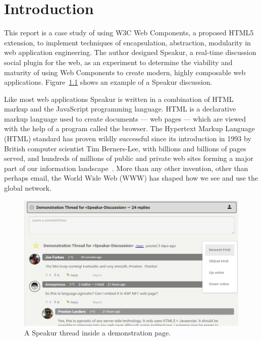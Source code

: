 \chapter{Introduction}
%
\label{ch:intro}

%
%

This report is a case study of using W3C Web Components, 
a proposed HTML5 extension,
to implement techniques of encapsulation, abstraction, modularity in web application engineering.
The author designed Speakur, a real-time discussion social plugin for the web, 
as an experiment to determine the viability and maturity of using Web Components to create modern, highly composable web applications. Figure~\ref{f:demo1} shows an example of a Speakur discussion.

Like most web applications Speakur is written in a combination of HTML markup and the Java\-Script programming language. 
HTML is a declarative markup language used to create documents --- web pages --- which are viewed with the help of a program called the browser. 
The Hyper\-text Markup Language (HTML) 
standard has proven wildly successful since its introduction in 1993 by British computer scientist 
Tim Berners-Lee, 
with billions and billions of pages served, 
and hundreds of millions of public and private web sites forming a major part of our information landscape~\cite{internetlivestats.com2015}.
More than any other invention, other than perhaps email, the World Wide Web (WWW) has shaped how we see and use the global network.

\begin{figure}[htb]
\centering
 \includegraphics[width=\textwidth]{images/screenshot_20150312_1630_v2.png}
\caption{A Speakur thread inside a demonstration page.}
\label{f:demo1}
\end{figure}

